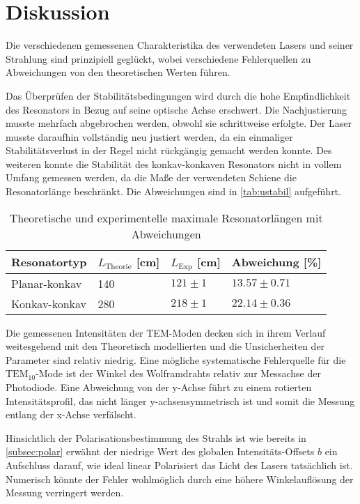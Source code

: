 \section{Diskussion}\label{sec:diskussion}
Die verschiedenen gemessenen Charakteristika des verwendeten Lasers und seiner Strahlung sind prinzipiell geglückt, wobei verschiedene Fehlerquellen zu Abweichungen von den theoretischen Werten führen.

Das Überprüfen der Stabilitätsbedingungen wird durch die hohe Empfindlichkeit des Resonators in Bezug auf seine optische Achse erschwert. Die Nachjustierung musste mehrfach abgebrochen werden, obwohl sie schrittweise erfolgte. Der Laser musste daraufhin vollständig neu justiert werden, da ein einmaliger Stabilitätsverlust in der Regel nicht rückgängig gemacht werden konnte.
Des weiteren konnte die Stabilität des konkav-konkaven Resonators nicht in vollem Umfang gemessen werden, da die Maße der verwendeten Schiene die Resonatorlänge beschränkt.
Die Abweichungen sind in \autoref{tab:ustabil} aufgeführt.
\begin{table}[H]
    \centering
    \caption{Theoretische und experimentelle maximale Resonatorlängen mit Abweichungen}
    \label{tab:ustabil}
    \begin{tabular}{l | l | l | l}
      \toprule
      {Resonatortyp} & {\(L_{\text{Theorie}}\) [\si{\centi\meter}]} & {\(L_{\text{Exp}}\) [\si{\centi\meter}]} & {Abweichung [\%]} \\
      \midrule
      Planar-konkav & 140 & \(121 \pm 1\) & \(13.57 \pm 0.71\) \\
      Konkav-konkav & 280 & \(218 \pm 1\) & \(22.14 \pm 0.36\) \\
      \bottomrule
    \end{tabular}
\end{table}

Die gemessenen Intensitäten der TEM-Moden decken sich in ihrem Verlauf weitesgehend mit den Theoretisch modellierten und die Unsicherheiten der Parameter sind relativ niedrig. Eine mögliche systematische Fehlerquelle für die $\mathrm{TEM_{10}}$-Mode ist der Winkel des Wolframdrahts relativ zur Messachse der Photodiode. Eine Abweichung von der y-Achse führt zu einem rotierten Intensitätsprofil, das nicht länger y-achsensymmetrisch ist und somit die Messung entlang der x-Achse verfälscht.

Hinsichtlich der Polarisationsbestimmung des Strahls ist wie bereits in \autoref{subsec:polar} erwähnt der niedrige Wert des globalen Intensitäts-Offsets $b$ ein Aufschluss darauf, wie ideal linear Polarisiert das Licht des Lasers tatsächlich ist. Numerisch könnte der Fehler wohlmöglich durch eine höhere Winkelauflösung der Messung verringert werden.

